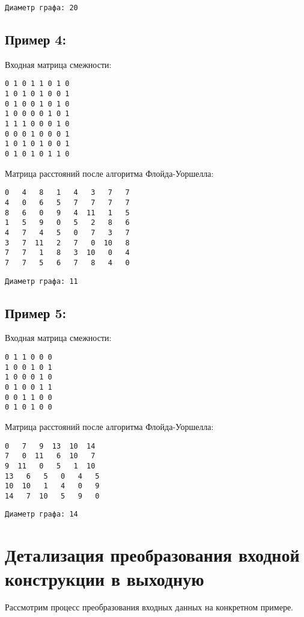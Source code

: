 \documentclass[12pt]{article}
\begin{document}
\begin{verbatim}
Диаметр графа: 20
\end{verbatim}

\subsection*{Пример 4:}

Входная матрица смежности:
\begin{verbatim}
0 1 0 1 1 0 1 0
1 0 1 0 1 0 0 1
0 1 0 0 1 0 1 0
1 0 0 0 0 1 0 1
1 1 1 0 0 0 1 0
0 0 0 1 0 0 0 1
1 0 1 0 1 0 0 1
0 1 0 1 0 1 1 0
\end{verbatim}
Матрица расстояний после алгоритма Флойда-Уоршелла:
\begin{verbatim}
0   4   8   1   4   3   7   7
4   0   6   5   7   7   7   7
8   6   0   9   4  11   1   5
1   5   9   0   5   2   8   6
4   7   4   5   0   7   3   7
3   7  11   2   7   0  10   8
7   7   1   8   3  10   0   4
7   7   5   6   7   8   4   0
\end{verbatim}

\begin{verbatim}
Диаметр графа: 11
\end{verbatim}

\subsection*{Пример 5:}

Входная матрица смежности:
\begin{verbatim}
0 1 1 0 0 0
1 0 0 1 0 1
1 0 0 0 1 0
0 1 0 0 1 1
0 0 1 1 0 0
0 1 0 1 0 0
\end{verbatim}
Матрица расстояний после алгоритма Флойда-Уоршелла:
\begin{verbatim}
0   7   9  13  10  14
7   0  11   6  10   7
9  11   0   5   1  10
13   6   5   0   4   5
10  10   1   4   0   9
14   7  10   5   9   0
\end{verbatim}

\begin{verbatim}
Диаметр графа: 14
\end{verbatim}

\section{Детализация преобразования входной конструкции в выходную}

Рассмотрим процесс преобразования входных данных на конкретном примере.
\setlength{\parskip}{0.2 cm} \par
\end{document}
